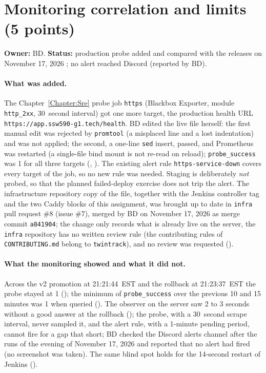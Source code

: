 \section{Monitoring correlation and limits (5 points)}\label{Section:deliveryMonitoring}
\textbf{Owner:} BD. \textbf{Status:} production probe added and compared with the releases on November 17, 2026 \StatusPass; no alert reached Discord (reported by BD).

\paragraph{What was added.} The Chapter~\ref{Chapter:Sre} probe job \texttt{https} (Blackbox Exporter, module \texttt{http\_2xx}, 30~second interval) got one more target, the production health URL \texttt{https://app.ssw590-g1.tech/health}.
BD edited the live file herself: the first manual edit was rejected by \texttt{promtool} (a misplaced line and a lost indentation) and was not applied; the second, a one-line \texttt{sed} insert, passed, and Prometheus was restarted
(a single-file bind mount is not re-read on reload); \texttt{probe\_success} was 1 for all three targets (, ). The existing alert rule \texttt{https-service-down} covers every target of the job, so no new rule was needed.
Staging is deliberately \emph{not} probed, so that the planned failed-deploy exercise does not trip the alert. The infrastructure repository copy of the file, together with the Jenkins controller tag and the two Caddy blocks of this assignment, was brought up to date in \texttt{infra} pull request \#8 (issue \#7), merged by BD on November 17, 2026 as merge commit \texttt{a841904}; the change only records what is already live on the server, the \texttt{infra} repository has no written review rule (the contributing rules of \texttt{CONTRIBUTING.md} belong to \texttt{twintrack}), and no review was requested ().

\paragraph{What the monitoring showed and what it did not.} Across the v2 promotion at 21:21:44~EST and the rollback at 21:23:37~EST the probe stayed at 1 (); the minimum of \texttt{probe\_success} over the previous 10 and 15 minutes was 1 when queried ().
The observer on the server saw 2 to 3 seconds without a good answer at the rollback (); the probe, with a 30~second scrape interval, never sampled it, and the alert rule, with a 1-minute pending period, cannot fire for a gap that short; BD checked the Discord alerts channel after the runs of the evening of November 17, 2026 and reported that no alert had fired (no screenshot was taken). The same blind spot holds for the 14-second restart of Jenkins ().

